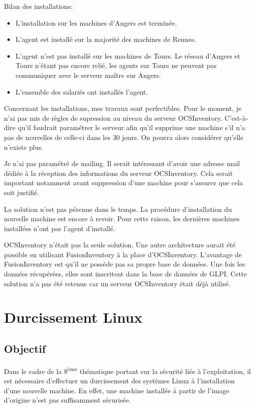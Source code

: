 \documentclass[12pt, a4paper, twoside]{article}
\begin{document}
Bilan des installations: 
\begin{itemize}
    \item L'installation sur les machines d'Angers est terminée.
    \item L'agent est installé sur la majorité des machines de Rennes.
    \item L'agent n'est pas installé sur les machines de Tours. 
    Le réseau d'Angers et Tours n'étant pas encore relié, les agents sur Tours ne peuvent pas communiquer avec le serveur maître sur Angers.
    \item L'ensemble des salariés ont installés l'agent.
\end{itemize}

Concernant les installations, mes travaux sont perfectibles.
Pour le moment, je n'ai pas mis de règles de supression au niveau du serveur \gls{OCSInventory}.
C'est-à-dire qu'il faudrait paramétrer le serveur afin qu'il supprime une machine s'il n'a pas de nouvelles de celle-ci dans les 30 jours.
On pourra alors considérer qu'elle n'existe plus.

Je n'ai pas paramétré de mailing.
Il serait intéressant d'avoir une adresse mail dédiée à la réception des informations du serveur \gls{OCSInventory}.
Cela serait important notamment avant suppression d'une machine pour s'assurer que cela soit justifié.

La solution n'est pas pérenne dans le temps.
La procédure d'installation du nouvelle machine est encore à revoir.
Pour cette raison, les dernières machines installées n'ont pas l'agent d'installé.

\gls{OCSInventory} n'était pas la seule solution.
Une autre architecture aurait été possible en utilisant FusionInventory à la place d'\gls{OCSInventory}. 
L'avantage de FusionInventory est qu'il ne possède pas sa propre base de données. 
Une fois les données récupérées, elles sont inscritent dans la base de données de \gls{GLPI}. 
Cette solution n'a pas été retenue car un serveur \gls{OCSInventory} était déjà utilisé.

\newpage
\section{Durcissement Linux}
\subsection{Objectif}
Dans le cadre de la 8\textsuperscript{ème} thématique portant sur la sécurité liée à l'exploitation, il est nécessaire d'effectuer un durcissement des systèmes \gls{Linux} à l'installation d'une nouvelle machine. 
En effet, une machine installée à partir de l'image d'origine n'est pas suffisamment sécurisée.
\end{document}
